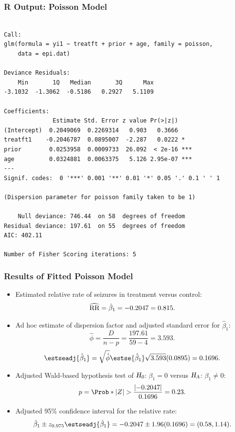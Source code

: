 \documentclass[oneside]{book}\usepackage[]{graphicx}\usepackage[svgnames]{xcolor}
\makeatletter
\newenvironment{kframe}{%
 \def\at@end@of@kframe{}%
 \ifinner\ifhmode%
  \def\at@end@of@kframe{\end{minipage}}%
  \begin{minipage}{\columnwidth}%
 \fi\fi%
 \def\FrameCommand##1{\hskip\@totalleftmargin \hskip-\fboxsep
 \colorbox{shadecolor}{##1}\hskip-\fboxsep
     \hskip-\linewidth \hskip-\@totalleftmargin \hskip\columnwidth}%
 \MakeFramed {\advance\hsize-\width
   \@totalleftmargin\z@ \linewidth\hsize
   \@setminipage}}%
 {\par\unskip\endMakeFramed%
 \at@end@of@kframe}
\newenvironment{knitrout}{}{} %
\let\exp\relax%
\newcommand{\HN}{\textsl{H}_{\textsl{0}}}%
\newcommand{\HA}{\textsl{H}_{\textsl{A}}}%
\newcommand{\RR}{\text{RR}}%
\DeclarePairedDelimiter\abs{\lvert}{\rvert}
\makeatother
\begin{document}
\subsubsection*{R Output: Poisson Model}
\begin{knitrout}
\color{fgcolor}\begin{kframe}
\begin{verbatim}

Call:
glm(formula = yi1 ~ treatft + prior + age, family = poisson, 
    data = epi.dat)

Deviance Residuals: 
    Min       1Q   Median       3Q      Max  
-3.1032  -1.3062  -0.5186   0.2927   5.1109  

Coefficients:
              Estimate Std. Error z value Pr(>|z|)    
(Intercept)  0.2049069  0.2269314   0.903   0.3666    
treatft1    -0.2046787  0.0895007  -2.287   0.0222 *  
prior        0.0253958  0.0009733  26.092  < 2e-16 ***
age          0.0324881  0.0063375   5.126 2.95e-07 ***
---
Signif. codes:  0 '***' 0.001 '**' 0.01 '*' 0.05 '.' 0.1 ' ' 1

(Dispersion parameter for poisson family taken to be 1)

    Null deviance: 746.44  on 58  degrees of freedom
Residual deviance: 197.61  on 55  degrees of freedom
AIC: 402.11

Number of Fisher Scoring iterations: 5
\end{verbatim}
\end{kframe}
\end{knitrout}
\subsubsection*{Results of Fitted Poisson Model}
\begin{itemize}
    \item Estimated relative rate of seizures in treatment versus control:
          \[ \widehat{\RR}=\exp{\hat{\beta}_1}=\exp{-0.2047}=0.815. \]
    \item Ad hoc estimate of dispersion factor and adjusted standard error for $ \hat{\beta}_1 $:
          \[ \hat{\phi}=\frac{D}{n-p}=\frac{197.61}{59-4}=3.593. \]
          \[ \estseadj{\hat{\beta}_1}=\sqrt{\hat{\phi}}\estse{\hat{\beta}_1}\sqrt{3.593}(0.0895)=0.1696. \]
    \item Adjusted Wald-based hypothesis test of $ \HN $: $ \beta_1=0 $ versus $ \HA $: $ \beta_1\ne 0 $:
          \[ p=\Prob*{\abs{Z}>\frac{\abs{-0.2047}}{0.1696}}=0.23. \]
    \item Adjusted 95\% confidence interval for the relative rate:
          \[ \exp{\hat{\beta}_1\pm z_{0.975}\estseadj{\hat{\beta}_1}}=\exp{-0.2047\pm 1.96(0.1696)}=(0.58,1.14). \]
\end{itemize}
\end{document}
